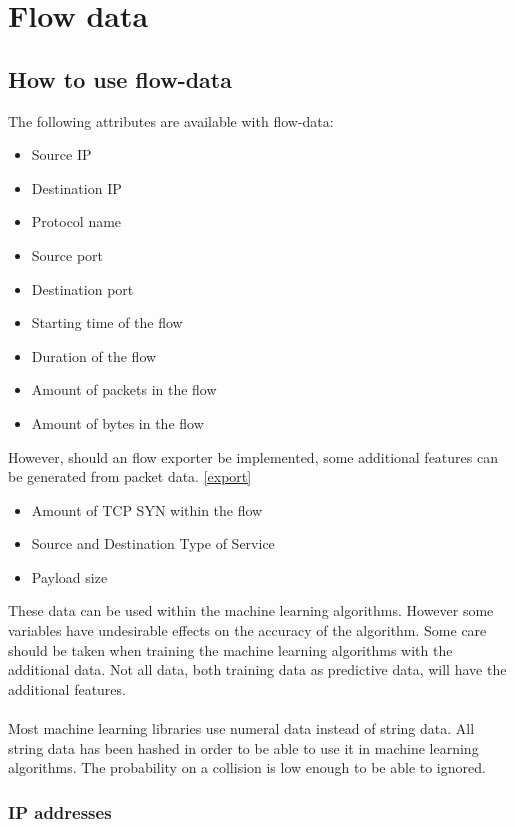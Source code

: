 
\chapter{Flow data} %

\label{flow} %

\section{How to use flow-data}
The following attributes are available with flow-data:
\begin{itemize}
\item Source IP
\item Destination IP
\item Protocol name
\item Source port
\item Destination port
\item Starting time of the flow
\item Duration of the flow
\item Amount of packets in the flow
\item Amount of bytes in the flow
\end{itemize}
However, should an flow exporter be implemented, some additional features can be generated from packet data. \ref{export}
\begin{itemize}
\item Amount of TCP SYN within the flow
\item Source and Destination Type of Service
\item Payload size
\end{itemize}
These data can be used within the machine learning algorithms. However some variables have undesirable effects on the accuracy of the algorithm. Some care should be taken when training the machine learning algorithms with the additional data. Not all data, both training data as predictive data, will have the additional features.\\
\\
Most machine learning libraries use numeral data instead of string data. All string data has been hashed in order to be able to use it in machine learning algorithms. The probability on a collision is low enough to be able to ignored.

\subsection{IP addresses}

